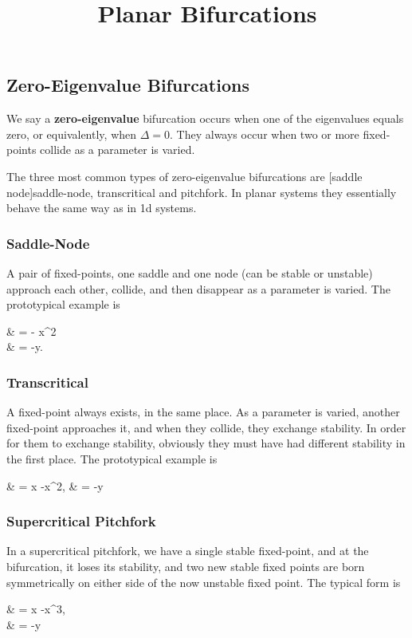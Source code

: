 \documentclass{article}
\title{Planar Bifurcations}
\begin{document}
\subsection{Zero-Eigenvalue Bifurcations}

\begin{definition}
We say a \textbf{zero-eigenvalue} bifurcation occurs when one of the eigenvalues equals zero, or equivalently, when $\Delta = 0.$ They always occur when two or more \@{fixed-points} collide as a parameter is varied.
\end{definition}

The three most common types of \@{zero-eigenvalue} bifurcations are \@[saddle node]{saddle-node}, \@{transcritical} and pitchfork. In planar systems they essentially behave the same way as in 1d systems.

\subsubsection{Saddle-Node}
A pair of \@{fixed-points}, one \@{saddle} and one \@{node} (can be stable or unstable) approach each other, collide, and then disappear as a parameter is varied. The prototypical example is

\bal
{} & = \mu - x^2 \\
 & = -y.
\eal

\subsubsection{Transcritical}
A \@{fixed-point} always exists, in the same place. As a parameter is varied, another \@{fixed-point} approaches it, and when they collide, they exchange stability. In order for them to exchange stability, obviously they must have had different stability in the first place. The prototypical example is

\bal
{} & = \mu x -x^2,
 & = -y
\eal

\subsubsection{Supercritical Pitchfork}
In a supercritical pitchfork, we have a single stable \@{fixed-point}, and at the \@{bifurcation}, it loses its stability, and two new stable fixed points are born symmetrically  on either side of the now unstable fixed point. The typical form is

\bal
{} & = \mu x -x^3, \\
 & = -y
\eal
\end{document}
